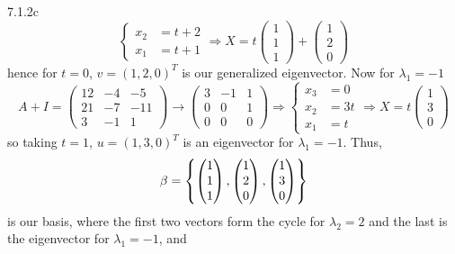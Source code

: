 \documentclass{exam}
\begin{document}
\begin{problem}{7.1.2c}
\[\begin{cases}
        x_2 &= t + 2 \\
        x_1 &= t + 1
      \end{cases}
      \Rightarrow X = t\begin{pmatrix}
        1 \\ 1 \\ 1
      \end{pmatrix}
      + \begin{pmatrix}
        1 \\ 2 \\ 0
      \end{pmatrix}
    \]
    hence for $t = 0$, $v = (1, 2, 0)^{T}$ is our generalized eigenvector. Now for $\lambda_1 = -1$
    \[
      A + I = \begin{pmatrix}
        12 & -4 & -5 \\
        21 & -7 & -11 \\
        3 & -1 & 1
      \end{pmatrix}
      \to \begin{pmatrix}
        3 & -1 & 1 \\
        0 & 0 & 1 \\
        0 & 0 & 0
      \end{pmatrix}
      \Rightarrow \begin{cases}
        x_3 &= 0 \\
        x_2 &= 3t \\
        x_1 &= t
      \end{cases}
      \Rightarrow X = t\begin{pmatrix}
        1 \\ 3 \\ 0
      \end{pmatrix}
    \]
    so taking $t = 1$, $u = (1, 3, 0)^{T}$ is an eigenvector for $\lambda_1 = -1$. Thus,
    \[
      \beta = \left\{
        \begin{pmatrix}
          1 \\ 1 \\ 1
        \end{pmatrix},
        \begin{pmatrix}
          1 \\ 2 \\ 0
        \end{pmatrix},
        \begin{pmatrix}
          1 \\ 3 \\ 0
        \end{pmatrix}
       \right\}
    \]
    is our basis, where the first two vectors form the cycle for $\lambda_2 = 2$ and the last is the eigenvector for $\lambda_1 = -1$, and

\end{problem}
\end{document}
